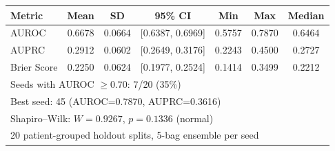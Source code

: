 \documentclass[border=8pt]{standalone}
\begin{document}
\begin{tabular}{l cccccc}
\toprule
\textbf{Metric} & \textbf{Mean} & \textbf{SD} & \textbf{95\% CI} & \textbf{Min} & \textbf{Max} & \textbf{Median} \\
\midrule
AUROC & 0.6678 & 0.0664 & [0.6387, 0.6969] & 0.5757 & 0.7870 & 0.6464 \\
AUPRC & 0.2912 & 0.0602 & [0.2649, 0.3176] & 0.2243 & 0.4500 & 0.2727 \\
Brier Score & 0.2250 & 0.0624 & [0.1977, 0.2524] & 0.1414 & 0.3499 & 0.2212 \\
\bottomrule
\multicolumn{7}{l}{\footnotesize Seeds with AUROC $\geq 0.70$: 7/20 (35\%)} \\
\multicolumn{7}{l}{\footnotesize Best seed: 45 (AUROC=0.7870, AUPRC=0.3616)} \\
\multicolumn{7}{l}{\footnotesize Shapiro--Wilk: $W=0.9267$, $p=0.1336$ (normal)} \\
\multicolumn{7}{l}{\footnotesize 20 patient-grouped holdout splits, 5-bag ensemble per seed} \\
\end{tabular}
\end{document}
